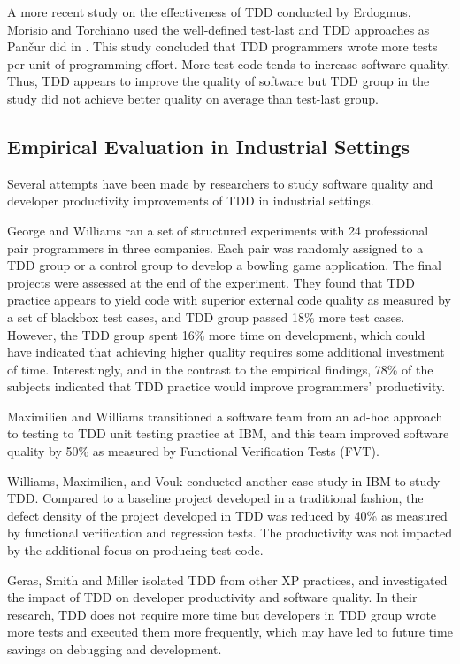 \documentclass[smallextended]{svjour3}     %
\begin{document}
A more recent study on the effectiveness of TDD conducted by Erdogmus,
Morisio and Torchiano \cite{Erdogmus:05} used the well-defined test-last
and TDD approaches as Pan\v{c}ur did in \cite{Matjaz:03}. This study 
concluded that TDD programmers wrote more tests per unit of programming 
effort. More test code tends to increase software quality. Thus, TDD appears 
to improve the quality of software but TDD group in the study did not 
achieve better quality on average than test-last group. 

\subsection{Empirical Evaluation in Industrial Settings}
Several attempts have been made by researchers to study software quality
and developer productivity improvements of TDD in industrial settings.  

George and Williams \cite{George:04} ran a set of structured experiments
with 24 professional pair programmers in three companies. Each pair was
randomly assigned to a TDD group or a control group to develop a bowling
game application. The final projects were assessed at the end of the
experiment.  They found that TDD practice appears to yield code with
superior external code quality as measured by a set of blackbox test cases,
and TDD group passed 18\% more test cases. However, the TDD group spent
16\% more time on development, which could have indicated that achieving
higher quality requires some additional investment of time. Interestingly,
and in the contrast to the empirical findings, 78\% of the subjects
indicated that TDD practice would improve programmers' productivity.

Maximilien and Williams \cite{Maximilien:03} transitioned a software team
from an ad-hoc approach to testing to TDD unit testing practice at IBM, and
this team improved software quality by 50\% as measured by Functional
Verification Tests (FVT).

Williams, Maximilien, and Vouk \cite{Williams:03} conducted another case
study in IBM to study TDD. Compared to a baseline project developed in a 
traditional fashion, the defect density of the project developed 
in TDD was reduced by 40\% as measured by functional verification and 
regression tests. The productivity was not impacted by the additional 
focus on producing test code. 

Geras, Smith and Miller \cite{Geras:04} isolated TDD from other XP
practices, and investigated the impact of TDD on developer productivity and
software quality. In their research, TDD does not require more time but
developers in TDD group wrote more tests and executed them more frequently,
which may have led to future time savings on debugging and development.
\end{document}
